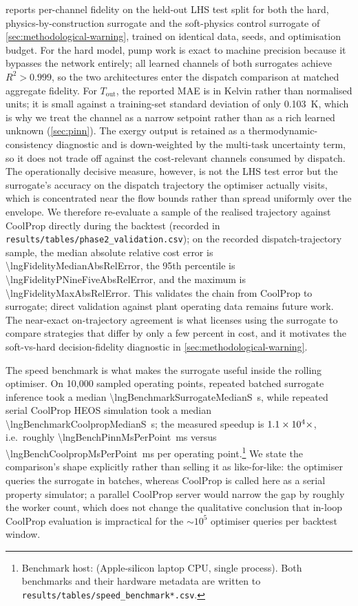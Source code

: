 \documentclass[11pt]{article}
\providecommand{\lngToutTrainStdK}{0.103}                      %
\begin{document}
 reports per-channel fidelity on the held-out LHS
test split for both the hard, physics-by-construction surrogate and the
soft-physics control surrogate of \cref{sec:methodological-warning}, trained on
identical data, seeds, and optimisation budget. For the hard model, pump work
is exact to machine precision because it bypasses the network entirely; all
learned channels of both surrogates achieve $R^2 > 0.999$, so the two
architectures enter the dispatch comparison at matched aggregate fidelity.
For $T_{\text{out}}$, the reported MAE is in Kelvin rather than normalised
units; it is small against a training-set standard deviation of only
\SI{\lngToutTrainStdK}{\kelvin}, which is why we treat the channel as a narrow
setpoint rather than as a rich learned unknown (\cref{sec:pinn}).
The exergy output is retained as a thermodynamic-consistency diagnostic and is
down-weighted by the multi-task uncertainty term, so it does not trade off
against the cost-relevant channels consumed by dispatch.
The operationally decisive measure, however, is not the LHS test error but
the surrogate's accuracy on the dispatch trajectory the optimiser actually
visits, which is concentrated near the flow bounds rather than spread
uniformly over the envelope. We therefore re-evaluate a sample of the
realised trajectory against CoolProp directly during the backtest (recorded
in \texttt{results/tables/phase2\_validation.csv}); on the recorded
dispatch-trajectory sample, the median absolute relative cost error is
\num{\lngFidelityMedianAbsRelError}, the 95th percentile is
\num{\lngFidelityPNineFiveAbsRelError}, and the maximum is
\num{\lngFidelityMaxAbsRelError}. This validates the chain from CoolProp to
surrogate; direct validation against plant operating data remains
future work. The near-exact on-trajectory agreement is what licenses using the
surrogate to compare strategies that differ by only a few percent in cost, and it
motivates the soft-vs-hard decision-fidelity diagnostic in
\cref{sec:methodological-warning}.

The speed benchmark is what makes the surrogate useful inside the rolling
optimiser. On 10,000 sampled operating points, repeated batched surrogate
inference took a median \SI{\lngBenchmarkSurrogateMedianS}{\second}, while
repeated serial CoolProp HEOS simulation took a median
\SI{\lngBenchmarkCoolpropMedianS}{\second}; the measured speedup is
$\num{1.1e+04}\times$, i.e.\ roughly
\num{\lngBenchPinnMsPerPoint}~ms versus
\num{\lngBenchCoolpropMsPerPoint}~ms per operating point.\footnote{Benchmark
host: \lngBenchMachine{} (Apple-silicon laptop CPU, single process). Both
benchmarks and their hardware metadata are written to
\texttt{results/tables/speed\_benchmark*.csv}.} We state the comparison's
shape explicitly rather than selling it as like-for-like: the optimiser
queries the surrogate in batches, whereas CoolProp is called here as a serial
property simulator; a parallel CoolProp server would narrow the gap by roughly
the worker count, which does not change the qualitative conclusion that
in-loop CoolProp evaluation is impractical for the
$\sim$$10^5$ optimiser queries per backtest window.
\end{document}
